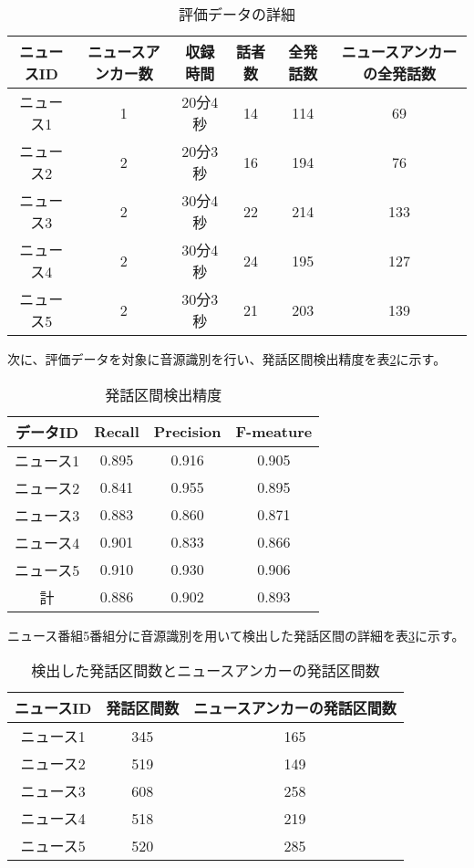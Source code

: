 \begin{table}[H]
  \begin{center}
    \caption{評価データの詳細 \label{table:test_detail}}
    \begin{tabular}{|c||c|c|c|c|c|} \hline
ニュースID & ニュースアンカー数 & 収録時間 & 話者数 & 全発話数 & ニュースアンカーの全発話数 \\ \hline
ニュース1  & 1 & 20分4秒 & 14 & 114 & 69 \\ \hline
ニュース2  & 2 & 20分3秒 & 16 & 194 & 76 \\ \hline
ニュース3  & 2 & 30分4秒 & 22 & 214 & 133 \\ \hline
ニュース4  & 2 & 30分4秒 & 24 & 195 & 127 \\ \hline
ニュース5  & 2 & 30分3秒 & 21 & 203 & 139 \\ \hline
    \end{tabular}
  \end{center}
\end{table}

次に、評価データを対象に音源識別を行い、発話区間検出精度を表\ref{table:test_detail_RPF}に示す。

\begin{table}[H]
  \begin{center}
    \caption{発話区間検出精度 \label{table:test_detail_RPF}}
    \begin{tabular}{|c||c|c|c|} \hline
      データID & Recall & Precision & F-meature \\ \hline
      ニュース1 & 0.895 & 0.916 & 0.905 \\ \hline
      ニュース2 & 0.841 & 0.955 & 0.895\\ \hline
      ニュース3 & 0.883 & 0.860 & 0.871 \\ \hline
      ニュース4 & 0.901 & 0.833 & 0.866\\ \hline
      ニュース5 & 0.910 & 0.930 & 0.906\\ \hline
      計 & 0.886 & 0.902 & 0.893\\ \hline
    \end{tabular}
  \end{center}
\end{table}

ニュース番組5番組分に音源識別を用いて検出した発話区間の詳細を表\ref{table:num_of_anchor}に示す。

\begin{table}[H]
  \begin{center}
    \caption{検出した発話区間数とニュースアンカーの発話区間数 \label{table:num_of_anchor}}
    \begin{tabular}{|c||c|c|} \hline
ニュースID & 発話区間数 & ニュースアンカーの発話区間数 \\ \hline
ニュース1  & 345   & 165 \\ \hline
ニュース2  & 519   & 149 \\ \hline
ニュース3  & 608   & 258 \\ \hline
ニュース4  & 518   & 219 \\ \hline
ニュース5  & 520   & 285 \\ \hline
    \end{tabular}
  \end{center}
\end{table}

